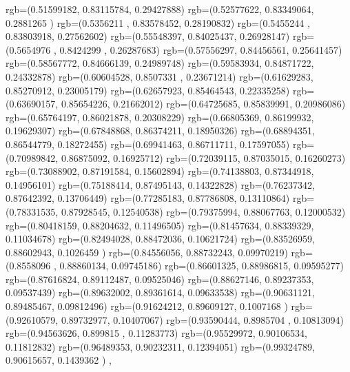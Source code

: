 {{{		  rgb=(0.51599182,  0.83115784,  0.29427888)
		  rgb=(0.52577622,  0.83349064,  0.2881265 )
		  rgb=(0.5356211 ,  0.83578452,  0.28190832)
		  rgb=(0.5455244 ,  0.83803918,  0.27562602)
		  rgb=(0.55548397,  0.84025437,  0.26928147)
		  rgb=(0.5654976 ,  0.8424299 ,  0.26287683)
		  rgb=(0.57556297,  0.84456561,  0.25641457)
		  rgb=(0.58567772,  0.84666139,  0.24989748)
		  rgb=(0.59583934,  0.84871722,  0.24332878)
		  rgb=(0.60604528,  0.8507331 ,  0.23671214)
		  rgb=(0.61629283,  0.85270912,  0.23005179)
		  rgb=(0.62657923,  0.85464543,  0.22335258)
		  rgb=(0.63690157,  0.85654226,  0.21662012)
		  rgb=(0.64725685,  0.85839991,  0.20986086)
		  rgb=(0.65764197,  0.86021878,  0.20308229)
		  rgb=(0.66805369,  0.86199932,  0.19629307)
		  rgb=(0.67848868,  0.86374211,  0.18950326)
		  rgb=(0.68894351,  0.86544779,  0.18272455)
		  rgb=(0.69941463,  0.86711711,  0.17597055)
		  rgb=(0.70989842,  0.86875092,  0.16925712)
		  rgb=(0.72039115,  0.87035015,  0.16260273)
		  rgb=(0.73088902,  0.87191584,  0.15602894)
		  rgb=(0.74138803,  0.87344918,  0.14956101)
		  rgb=(0.75188414,  0.87495143,  0.14322828)
		  rgb=(0.76237342,  0.87642392,  0.13706449)
		  rgb=(0.77285183,  0.87786808,  0.13110864)
		  rgb=(0.78331535,  0.87928545,  0.12540538)
		  rgb=(0.79375994,  0.88067763,  0.12000532)
		  rgb=(0.80418159,  0.88204632,  0.11496505)
		  rgb=(0.81457634,  0.88339329,  0.11034678)
		  rgb=(0.82494028,  0.88472036,  0.10621724)
		  rgb=(0.83526959,  0.88602943,  0.1026459 )
		  rgb=(0.84556056,  0.88732243,  0.09970219)
		  rgb=(0.8558096 ,  0.88860134,  0.09745186)
		  rgb=(0.86601325,  0.88986815,  0.09595277)
		  rgb=(0.87616824,  0.89112487,  0.09525046)
		  rgb=(0.88627146,  0.89237353,  0.09537439)
		  rgb=(0.89632002,  0.89361614,  0.09633538)
		  rgb=(0.90631121,  0.89485467,  0.09812496)
		  rgb=(0.91624212,  0.89609127,  0.1007168 )
		  rgb=(0.92610579,  0.89732977,  0.10407067)
		  rgb=(0.93590444,  0.8985704 ,  0.10813094)
		  rgb=(0.94563626,  0.899815  ,  0.11283773)
		  rgb=(0.95529972,  0.90106534,  0.11812832)
		  rgb=(0.96489353,  0.90232311,  0.12394051)
		  rgb=(0.99324789,  0.90615657,  0.1439362 )
		},
	}
}

